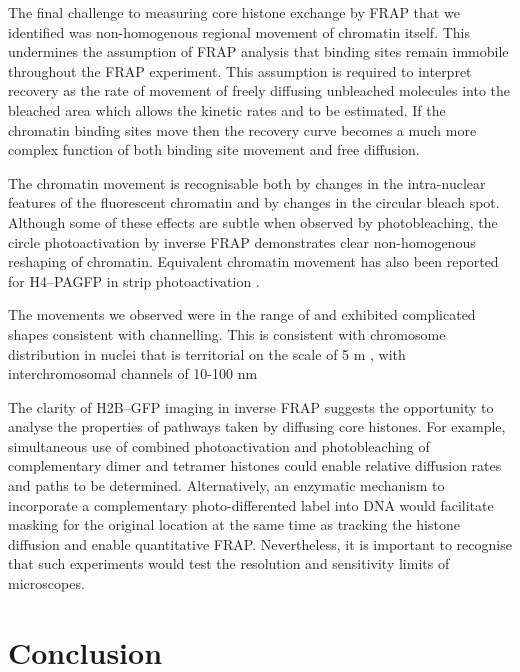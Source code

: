 
    The final challenge to measuring core histone exchange by FRAP that we identified 
    was non-homogenous regional movement of chromatin itself.
    This undermines the assumption of FRAP analysis that binding sites 
    remain immobile throughout the FRAP experiment.
    This assumption is required to interpret recovery
    as the rate of movement of freely diffusing unbleached molecules into the
    bleached area which allows the kinetic rates \Kon{} and \Koff{} to be estimated.
    If the chromatin binding sites move then the recovery curve becomes a 
    much more complex function of both binding site movement and free diffusion.

    The chromatin movement is recognisable both 
    by changes in the intra-nuclear features of the fluorescent chromatin 
    and by changes in the circular bleach spot.
    Although some of these effects are subtle when observed by photobleaching,
    the circle photoactivation by inverse FRAP demonstrates 
    clear non-homogenous reshaping of chromatin.
    Equivalent chromatin movement has also been reported 
    for H4--PAGFP in strip photoactivation \cite{H4PAGFP-chromatin-movement}.

    The movements we observed were in the range of  
    and exhibited complicated shapes consistent with channelling.
    This is consistent with chromosome distribution in nuclei that is 
    territorial on the scale of 5 \textmu m , 
    with interchromosomal channels of 10-100 nm 
    
    The clarity of H2B--GFP imaging in inverse FRAP suggests the opportunity to analyse the 
    properties of pathways taken by diffusing core histones. 
    For example, simultaneous use of combined photoactivation and photobleaching 
    of complementary dimer and tetramer histones could 
    enable relative diffusion rates and paths to be determined.
    Alternatively, an enzymatic mechanism to incorporate a 
    complementary photo-differented label into DNA  would facilitate masking for 
    the original location at the same time as tracking the histone diffusion
    and enable quantitative FRAP.
    Nevertheless, it is important to recognise that such experiments would test the 
    resolution and sensitivity limits of microscopes.

\section{Conclusion}

